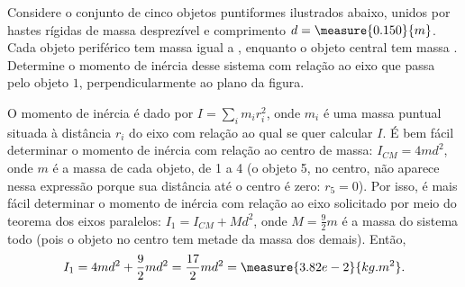 \begin{question}
	Considere o conjunto de cinco objetos puntiformes ilustrados abaixo, unidos por hastes rígidas de massa desprezível e comprimento $d = \measure{0.150}{m}$.
	Cada objeto periférico tem massa igual a , enquanto o objeto central tem massa .
	Determine o momento de inércia desse sistema com relação ao eixo que passa pelo objeto $1$, perpendicularmente ao plano da figura.


	\begin{answer}
	\end{answer}

	\begin{solution}
		O momento de inércia é dado por $I = \sum_i m_i r_i^2$, onde $m_i$ é uma massa puntual situada à distância $r_i$ do eixo com relação ao qual se quer calcular $I$.
		É bem fácil determinar o momento de inércia com relação ao centro de massa: $I_{CM} = 4md^2$, onde $m$ é a massa de cada objeto, de 1 a 4 (o objeto 5, no centro, não aparece nessa expressão porque sua distância até o centro é zero: $r_5 = 0$).
		Por isso, é mais fácil determinar o momento de inércia com relação ao eixo solicitado por meio do teorema dos eixos paralelos: $I_1 = I_{CM} + Md^2$, onde $M = \frac{9}{2}m$ é a massa do sistema todo (pois o objeto no centro tem metade da massa dos demais).
		Então,
		\begin{equation*}
			I_1 = 4md^2 + \frac{9}{2}md^2 = \frac{17}{2}md^2 = \measure{3.82e-2}{kg.m^2}.
		\end{equation*}
	\end{solution}
\end{question}

\begin{comment}
```python
def question_2ii(d, m):
	return 17.0/2 * m * d**2
```
\end{comment}